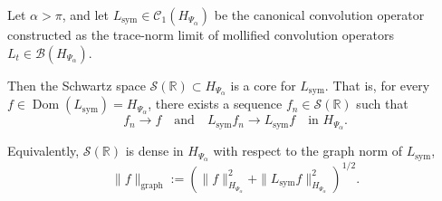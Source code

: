 \begin{proposition}
\label{prop:core_schwartz_density}
Let \( \alpha > \pi \), and let \( L_{\mathrm{sym}} \in \mathcal{C}_1(H_{\Psi_\alpha}) \) be the canonical convolution operator constructed as the trace-norm limit of mollified convolution operators \( L_t \in \mathcal{B}(H_{\Psi_\alpha}) \).

Then the Schwartz space \( \mathcal{S}(\mathbb{R}) \subset H_{\Psi_\alpha} \) is a core for \( L_{\mathrm{sym}} \). That is, for every \( f \in \operatorname{Dom}(L_{\mathrm{sym}}) = H_{\Psi_\alpha} \), there exists a sequence \( f_n \in \mathcal{S}(\mathbb{R}) \) such that
\[
f_n \to f \quad \text{and} \quad L_{\mathrm{sym}} f_n \to L_{\mathrm{sym}} f \quad \text{in } H_{\Psi_\alpha}.
\]

\noindent Equivalently, \( \mathcal{S}(\mathbb{R}) \) is dense in \( H_{\Psi_\alpha} \) with respect to the graph norm of \( L_{\mathrm{sym}} \),
\[
\|f\|_{\mathrm{graph}} := \left( \|f\|_{H_{\Psi_\alpha}}^2 + \|L_{\mathrm{sym}} f\|_{H_{\Psi_\alpha}}^2 \right)^{1/2}.
\]
\end{proposition}
